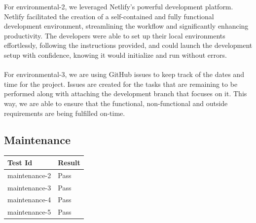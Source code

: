 \documentclass[12pt, titlepage]{article}
\begin{document}
\newpage

For environmental-2, we leveraged Netlify's powerful development platform. Netlify facilitated the creation of a self-contained and fully functional development environment, streamlining the workflow and significantly enhancing productivity. The developers were able to set up their local environments effortlessly, following the instructions provided, and could launch the development setup with confidence, knowing it would initialize and run without errors.
\\ \\
For environmental-3, we are using GitHub issues to keep track of the dates and time for the project. Issues are created for the tasks that are remaining to be performed along with attaching the development branch that focuses on it. This way, we are able to ensure that the functional, non-functional and outside requirements are being fulfilled on-time.


\subsection{Maintenance}

\begin{center}
\begin{tabular}{|p{4cm} | p{4cm}| }
\hline
\textbf{Test Id} & \textbf{Result} \\
\hline
maintenance-2 & Pass \\
\hline
maintenance-3 & Pass \\
\hline
maintenance-4 & Pass \\
\hline
maintenance-5 & Pass \\
\hline

\end{tabular}
\end{center}
\end{document}
